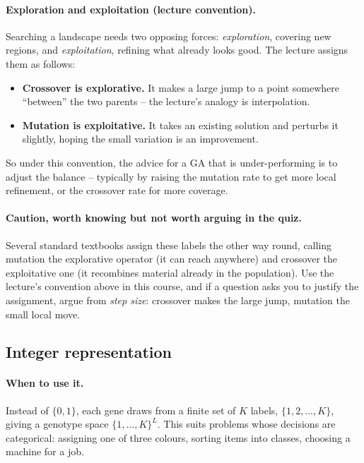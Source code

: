 \documentclass[11pt,a4paper]{article}
\begin{document}
\paragraph{Exploration and exploitation (lecture convention).}
Searching a landscape needs two opposing forces: \emph{exploration}, covering
new regions, and \emph{exploitation}, refining what already looks good. The
lecture assigns them as follows:
\begin{itemize}
\item \textbf{Crossover is explorative.} It makes a large jump to a point
      somewhere ``between'' the two parents -- the lecture's analogy is
      interpolation.
\item \textbf{Mutation is exploitative.} It takes an existing solution and
      perturbs it slightly, hoping the small variation is an improvement.
\end{itemize}
So under this convention, the advice for a GA that is under-performing is to
adjust the balance -- typically by raising the mutation rate to get more
local refinement, or the crossover rate for more coverage.

\paragraph{Caution, worth knowing but not worth arguing in the quiz.} Several
standard textbooks assign these labels the other way round, calling mutation
the explorative operator (it can reach anywhere) and crossover the
exploitative one (it recombines material already in the population). Use the
lecture's convention above in this course, and if a question asks you to
justify the assignment, argue from \emph{step size}: crossover makes the large
jump, mutation the small local move.

\subsection{Integer representation}

\paragraph{When to use it.}
Instead of $\{0,1\}$, each gene draws from a finite set of $K$ labels,
$\{1,2,\ldots,K\}$, giving a genotype space $\{1,\ldots,K\}^L$. This suits
problems whose decisions are categorical: assigning one of three colours,
sorting items into classes, choosing a machine for a job.
\end{document}
